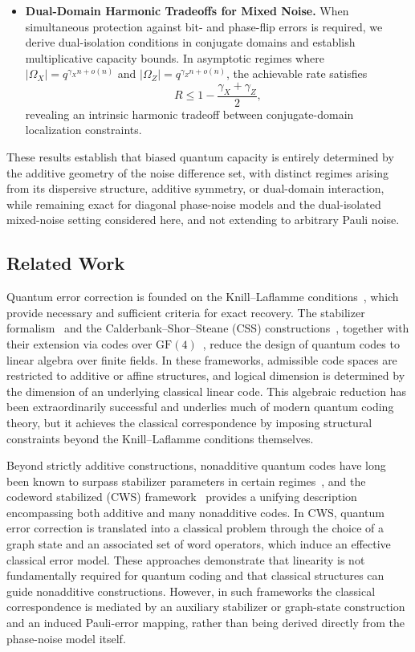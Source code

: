\documentclass[a4paper,twocolumn,11pt,allowtoday]{quantumarticle}
\theoremstyle{plain}
\theoremstyle{definition}
\theoremstyle{remark}
\begin{document}
\begin{itemize}
\item \textbf{Dual-Domain Harmonic Tradeoffs for Mixed Noise.}
When simultaneous protection against bit- and phase-flip errors is required, we derive dual-isolation conditions in conjugate domains and establish multiplicative capacity bounds. In asymptotic regimes where $|\Omega_X|=q^{\gamma_X n+o(n)}$ and $|\Omega_Z|=q^{\gamma_Z n+o(n)}$, the achievable rate satisfies
\[
R \le 1-\frac{\gamma_X+\gamma_Z}{2},
\]
revealing an intrinsic harmonic tradeoff between conjugate-domain localization constraints.

\end{itemize}

These results establish that biased quantum capacity is entirely determined by the additive geometry of the noise difference set, with distinct regimes arising from its dispersive structure, additive symmetry, or dual-domain interaction, while remaining exact for diagonal phase-noise models and the dual-isolated mixed-noise setting considered here, and not extending to arbitrary Pauli noise.

\subsection{Related Work}

Quantum error correction is founded on the Knill–Laflamme conditions~\cite{KnillLaflamme1997}, which provide necessary and sufficient criteria for exact recovery. The stabilizer formalism~\cite{Gottesman1997} and the Calderbank–Shor–Steane (CSS) constructions~\cite{CalderbankShor1996,Steane1996}, together with their extension via codes over $\mathrm{GF}(4)$~\cite{CRSS1998}, reduce the design of quantum codes to linear algebra over finite fields. In these frameworks, admissible code spaces are restricted to additive or affine structures, and logical dimension is determined by the dimension of an underlying classical linear code. This algebraic reduction has been extraordinarily successful and underlies much of modern quantum coding theory, but it achieves the classical correspondence by imposing structural constraints beyond the Knill–Laflamme conditions themselves.

Beyond strictly additive constructions, nonadditive quantum codes have long been known to surpass stabilizer parameters in certain regimes~\cite{Rains1999}, and the codeword stabilized (CWS) framework~\cite{Cross2009} provides a unifying description encompassing both additive and many nonadditive codes. In CWS, quantum error correction is translated into a classical problem through the choice of a graph state and an associated set of word operators, which induce an effective classical error model. These approaches demonstrate that linearity is not fundamentally required for quantum coding and that classical structures can guide nonadditive constructions. However, in such frameworks the classical correspondence is mediated by an auxiliary stabilizer or graph-state construction and an induced Pauli-error mapping, rather than being derived directly from the phase-noise model itself.
\end{document}
